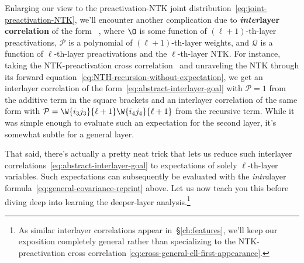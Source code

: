 Enlarging
our view to the preactivation-NTK joint distribution~\eqref{eq:joint-preactivation-NTK}, we'll encounter another complication due to \textbf{\emph{inter}layer correlation} of the form
\be\label{eq:abstract-interlayer-goal}
\, ,
\ee
where $\O$ is some
function of $(\ell+1)$-th-layer preactivations,
$\mathcal{P}$ is a polynomial of $(\ell+1)$-th-layer weights,
and $\mathcal{Q}$ is a function of $\ell$-th-layer preactivations
and the $\ell$-th-layer NTK.
For instance, taking the NTK-preactivation cross correlation
\be\label{eq:cross-general-ell-first-appearance}
\, 
\ee
and unraveling the NTK through its forward equation~\eqref{eq:NTH-recursion-without-expectation}, we get an interlayer correlation of the form~\eqref{eq:abstract-interlayer-goal} with $\mathcal{P}=1$ from the additive term in the square brackets and an interlayer correlation of the same form with $\mathcal{P}=\W{i_3j_3}{\ell+1}\W{i_4j_4}{\ell+1}$ from the recursive term.
While it was simple enough to evaluate such an expectation for the second layer,
it's somewhat subtle for a general layer.

That said, there's actually a pretty neat trick that lets us reduce such interlayer correlations~\eqref{eq:abstract-interlayer-goal} to expectations of solely $\ell$-th-layer variables. Such expectations can subsequently be evaluated with the \emph{intra}layer formula~\eqref{eq:general-covariance-reprint} above.
Let us now teach you this  before diving deep into learning the deeper-layer analysis.\footnote{
    As similar interlayer correlations appear in~\S\ref{ch:features}, we'll keep our exposition completely general rather than specializing to the NTK-preactivation cross correlation \eqref{eq:cross-general-ell-first-appearance}.
}




